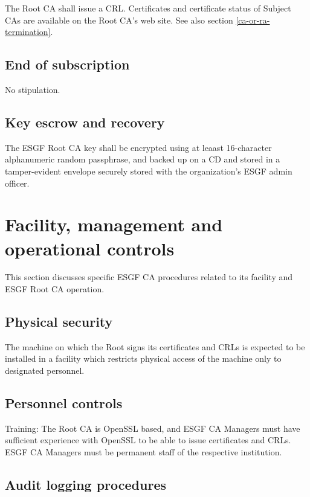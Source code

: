 The Root CA shall issue a CRL. Certificates and certificate status of
Subject CAs are available on the Root CA's web site. See also section
\ref{ca-or-ra-termination}.

\subsection{End of subscription}\label{end-of-subscription}

No stipulation.

\subsection{Key escrow and recovery}

The ESGF Root CA key shall be encrypted using at leaast 16-character alphanumeric random passphrase, and backed up on a CD and stored in a tamper-evident envelope securely stored with the organization's ESGF admin officer.

\section{Facility, management and operational controls}\label{facility-management-and-operational-controls}

This section discusses specific ESGF CA procedures related to its
facility and ESGF Root CA operation.

\subsection{Physical security}\label{physical-security-controls}

The machine on which the Root signs its certificates and CRLs is
expected to be installed in a facility which restricts physical access of the machine only to designated personnel.
\subsection{Personnel controls}\label{personnel-controls}

Training: The Root CA is OpenSSL based, and ESGF CA Managers must
have sufficient experience with OpenSSL to be able to issue certificates
and CRLs. ESGF CA Managers must be permanent staff of the respective institution.

\subsection{Audit logging procedures}\label{audit-logging-procedures}

